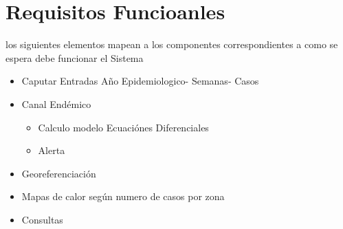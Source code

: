 \chapter{Requisitos Funcioanles}


los siguientes elementos mapean a los componentes  correspondientes a como se espera debe funcionar el Sistema

\begin{itemize}
	\item Caputar Entradas Año Epidemiologico- Semanas- Casos
	\item Canal Endémico
		\begin{itemize}
			\item Calculo modelo Ecuaciónes Diferenciales
			\item Alerta 
		\end{itemize}
	\item Georeferenciación
	\item Mapas de calor según numero de casos por zona
	\item Consultas

\end{itemize}
